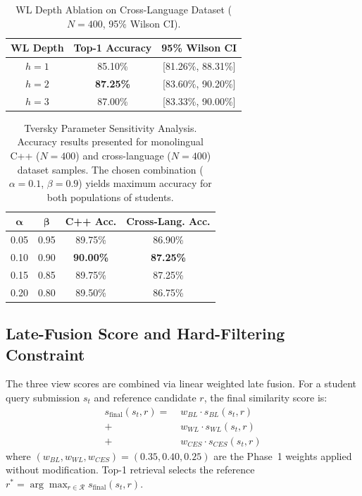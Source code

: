 \begin{table}[ht]
\caption{WL Depth Ablation on Cross-Language Dataset ($N=400$, 95\% Wilson CI).}
\label{tab:wl_ablation}
\centering
\begin{tabular}{|c|c|c|}
\hline
\textbf{WL Depth} & \textbf{Top-1 Accuracy} & \textbf{95\% Wilson CI} \\
\hline
$h=1$ & 85.10\% & [81.26\%, 88.31\%] \\
$h=2$ & \textbf{87.25\%} & [83.60\%, 90.20\%] \\
$h=3$ & 87.00\% & [83.33\%, 90.00\%] \\
\hline
\end{tabular}
\end{table}

\begin{table}[ht]
\caption{Tversky Parameter Sensitivity Analysis. Accuracy results presented for monolingual C++ ($N=400$) and cross-language ($N=400$) dataset samples. The chosen combination ($\alpha{=}0.1$, $\beta{=}0.9$) yields maximum accuracy for both populations of students.}
\label{tab:tversky_sensitivity}
\centering
\begin{tabular}{|c|c|c|c|}
\hline
$\boldsymbol{\alpha}$ & $\boldsymbol{\beta}$ & \textbf{C++ Acc.} & \textbf{Cross-Lang. Acc.} \\
\hline
0.05 & 0.95 & 89.75\% & 86.90\% \\
0.10 & 0.90 & \textbf{90.00\%} & \textbf{87.25\%} \\
0.15 & 0.85 & 89.75\% & 87.25\% \\
0.20 & 0.80 & 89.50\% & 86.75\% \\
\hline
\end{tabular}
\end{table}

\subsection{Late-Fusion Score and Hard-Filtering Constraint}
\label{subsec:late_fusion}

The three view scores are combined via linear weighted late fusion. For a student query submission $s_t$ and reference candidate $r$, the final similarity score is:
\begin{equation}
\begin{split}
    s_{\text{final}}(s_t, r) = &\; w_{BL} \cdot s_{BL}(s_t, r) \\
                               +&\; w_{WL} \cdot s_{WL}(s_t, r) \\
                               +&\; w_{CES} \cdot s_{CES}(s_t, r)
\end{split}
\end{equation}
where $(w_{BL}, w_{WL}, w_{CES}) = (0.35, 0.40, 0.25)$ are the Phase~1 weights applied without modification. Top-1 retrieval selects the reference $r^* = \arg\max_{r \in \mathcal{R}} s_{\text{final}}(s_t, r)$.

